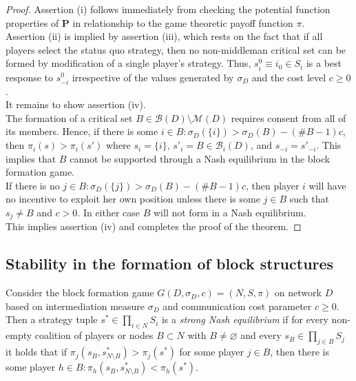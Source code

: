 \begin{proof}
Assertion (i) follows immediately from checking the potential function properties of $\mathbf{P}$ in relationship to the game theoretic payoff function $\pi$.
\\[1ex]
Assertion (ii) is implied by assertion (iii), which rests on the fact that if all players select the status quo strategy, then no non-middleman critical set can be formed by modification of a single player's strategy. Thus, $s^0_i \equiv i_0 \in S_i$ is a best response to $s^0_{-i}$ irrespective of the values generated by $\sigma_D$ and the cost level $c \geqslant 0$.
\\[1ex]
It remains to show assertion (iv).
\\
The formation of a critical set $B \in \mathcal{B} (D) \setminus \mathcal{M} (D)$ requires consent from all of its members. Hence, if there is some $i \in B \colon \sigma_D (\{ i \}) > \sigma_D (B) - (\# B -1)c$, then $\pi_{i}(s) > \pi_{i}(s')$ where $s_{i} = \{ i \}$, $s'_{i} = B \in \mathcal{B}_i (D)$, and $s_{-i} = s'_{-i}$. This implies that $B$ cannot be supported through a Nash equilibrium in the block formation game.
\\
If there is no $j \in B \colon \sigma_D (\{ j \}) > \sigma_D (B) - (\# B -1)c$, then player $i$ will have no incentive to exploit her own position unless there is some $j \in B$ such that $s_{j} \neq B$ and $c > 0$. In either case $B$ will not form in a Nash equilibrium.
\\
This implies assertion (iv) and completes the proof of the theorem. 
\end{proof}

\subsection{Stability in the formation of block structures}

Consider the block formation game $G (D, \sigma_D ,c) = (N,S, \pi )$ on network $D$ based on intermediation measure $\sigma_D$ and communication cost parameter $c \geqslant 0$. Then a strategy tuple $s^* \in \prod_{i \in N} S_i$ is a \emph{strong Nash equilibrium} \citep{Aumann1959} if for every non-empty coalition of players or nodes $B \subset N$ with $B \neq \varnothing$ and every $s_B \in \prod_{j \in B} S_j$ it holds that if $\pi_j (s_B, s^*_{N \setminus B}) > \pi_j (s^*)$ for some player $j \in B$, then there is some player $h \in B \colon \pi_h (s_B, s^*_{N \setminus B}) < \pi_h (s^*)$.

